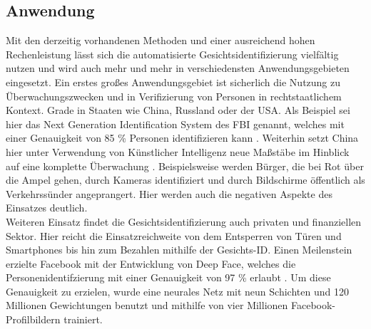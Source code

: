 \documentclass[doktyp=semarbeit, sprache=german]{TUBAFarbeiten}
\begin{document}
\subsection{Anwendung}
Mit den derzeitig vorhandenen Methoden und einer ausreichend hohen Rechenleistung lässt sich die automatisierte Gesichtsidentifizierung vielfältig nutzen und wird auch mehr und mehr in verschiedensten Anwendungsgebieten eingesetzt. Ein erstes großes Anwendungsgebiet ist sicherlich die Nutzung zu Überwachungszwecken und in Verifizierung von Personen in rechtstaatlichem Kontext. Grade in Staaten wie China, Russland oder der USA. Als Beispiel sei hier das \glqq Next Generation Identification System\grqq{} des FBI genannt, welches mit einer Genauigkeit von 85 \% Personen identifizieren kann \cite{FBI}. Weiterhin setzt China hier unter Verwendung von Künstlicher Intelligenz neue Maßstäbe im Hinblick auf eine komplette Überwachung \cite{China}. Beispielsweise werden Bürger, die bei Rot über die Ampel gehen, durch Kameras identifiziert und durch Bildschirme öffentlich als Verkehrssünder angeprangert. Hier werden auch die negativen Aspekte des Einsatzes deutlich.
\\Weiteren Einsatz findet die Gesichtsidentifizierung auch privaten und finanziellen Sektor. Hier reicht die Einsatzreichweite von dem Entsperren von Türen und Smartphones bis hin zum Bezahlen mithilfe der Gesichts-ID.
Einen Meilenstein erzielte Facebook mit der Entwicklung von \glqq Deep Face\grqq{}, welches die Personenidentifzierung mit einer Genauigkeit von 97 \% erlaubt \cite{DeepFace}. Um diese Genauigkeit zu erzielen, wurde eine neurales Netz mit neun Schichten und 120 Millionen Gewichtungen benutzt und mithilfe von vier Millionen Facebook-Profilbildern trainiert.
\end{document}
